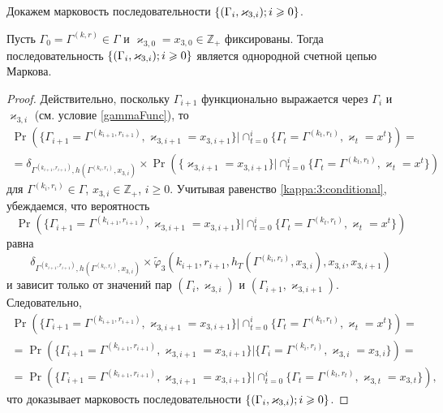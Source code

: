 \documentclass[a4paper,12pt,russian]{extarticle}
\newcommand{\MarkThree}{\{(\Gamma_i, \varkappa_{3,i}); \hm{} i \geqslant 0\}}
\begin{document}
Докажем марковость последовательности $\MarkThree$.
\begin{theorem}
Пусть $\Gamma_0=\Gamma^{(k,r)}\in \Gamma$ и $\varkappa_{3,0}=x_{3,0}\in \mathbb{Z}_+$ фиксированы. Тогда последовательность $\MarkThree$ является однородной счетной цепью Маркова.
\end{theorem}
\begin{proof}
Действительно, поскольку $\Gamma_{i+1}$ функционально выражается через $\Gamma_i$ и $\varkappa_{3,i}$ (см. условие \eqref{gammaFunc}), то
\begin{multline*}
\Pr (\{ \Gamma_{i+1} =\Gamma^{(k_{i+1},r_{i+1})},\varkappa_{3,i+1} = x_{3,i+1}\} |\cap_{t=0}^{i}\{ \Gamma_t=\Gamma^{(k_t,r_t)}, \varkappa_t=x^t\})=\\
=\delta_{\Gamma^{(k_{i+1},r_{i+1})},h(\Gamma^{(k_i,r_i)},x_{3,i})}\times \Pr (\{  \varkappa_{3,i+1} = x_{3,i+1}\} |\cap_{t=0}^{i}\{ \Gamma_t=\Gamma^{(k_t,r_t)}, \varkappa_t=x^t\})
\end{multline*}
для $\Gamma^{(k_i,r_i)}\in \Gamma$, $x_{3,i}\in {\mathbb Z}_+$, $i\geqslant 0$. Учитывая равенство \eqref{kappa:3:conditional}, убеждаемся, что вероятность 
$$
\Pr (\{ \Gamma_{i+1} =\Gamma^{(k_{i+1},r_{i+1})},\varkappa_{3,i+1} = x_{3,i+1}\} |\cap_{t=0}^{i}\{\Gamma_t=\Gamma^{(k_t,r_t)}, \varkappa_t=x^t\}) 
$$ 
равна
$$
\delta_{\Gamma^{(k_{i+1},r_{i+1})},h(\Gamma^{(k_i,r_i)},x_{3,i})} \times \widetilde{\varphi}_3(k_{i+1},r_{i+1},h_T(\Gamma^{(k_i,r_i)},x_{3,i}),x_{3,i},x_{3,i+1})
$$
и зависит только от значений пар $(\Gamma_i,\varkappa_{3,i})$ и $(\Gamma_{i+1},\varkappa_{3,i+1})$. Следовательно, 
\begin{multline*}
\Pr (\{ \Gamma_{i+1} =\Gamma^{(k_{i+1},r_{i+1})},\varkappa_{3,i+1} = x_{3,i+1}\} |\cap_{t=0}^{i}\{\Gamma_t=\Gamma^{(k_t,r_t)}, \varkappa_t=x^t\})=\\
=\Pr (\{  \Gamma_{i+1} =\Gamma^{(k_{i+1},r_{i+1})},\varkappa_{3,i+1} = x_{3,i+1}\} |\{ \Gamma_i=\Gamma^{(k_i,r_i)}, \varkappa_{3,i}=x_{3,i}\}) = \\
=\Pr (\{ \Gamma_{i+1} =\Gamma^{(k_{i+1},r_{i+1})},\varkappa_{3,i+1} = x_{3,i+1}\} |\cap_{t=0}^{i}\{ \Gamma_t=\Gamma^{(k_t,r_t)}, \varkappa_{3,t}=x_{3,t}\}),
\end{multline*}
что доказывает марковость последовательности $\MarkThree$.
\end{proof}
\end{document}
